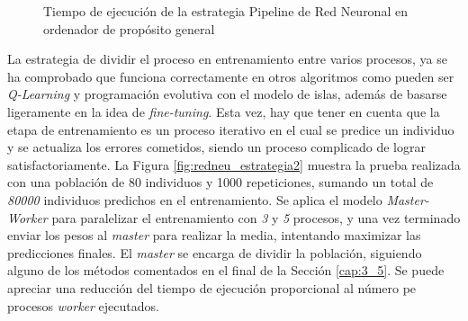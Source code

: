 			\begin{figure}[!h]
				\centering
				\caption{Tiempo de ejecución de la estrategia Pipeline de Red Neuronal en ordenador de propósito general}
				\label{fig:redneu_estrategia1}
			\end{figure}

			
			

			La estrategia de dividir el proceso en entrenamiento entre varios procesos, ya se ha comprobado que funciona correctamente en otros algoritmos como pueden ser \textit{Q-Learning} y programación evolutiva con el modelo de islas, además de basarse ligeramente en la idea de \textit{fine-tuning}. Esta vez, hay que tener en cuenta que la etapa de entrenamiento es un proceso iterativo en el cual se predice un individuo y se actualiza los errores cometidos, siendo un proceso complicado de lograr satisfactoriamente. La Figura \ref{fig:redneu_estrategia2} muestra la prueba realizada con una población de 80 individuos y 1000 repeticiones, sumando un total de \textit{80000} individuos predichos en el entrenamiento. Se aplica el modelo \textit{Master-Worker} para paralelizar el entrenamiento con \textit{3} y \textit{5} procesos, y una vez terminado enviar los pesos al \textit{master} para realizar la media, intentando maximizar las predicciones finales. El \textit{master} se encarga de dividir la población, siguiendo alguno de los métodos comentados en el final de la Sección \ref{cap:3_5}. Se puede apreciar una reducción del tiempo de ejecución proporcional al número pe procesos \textit{worker} ejecutados.
		
